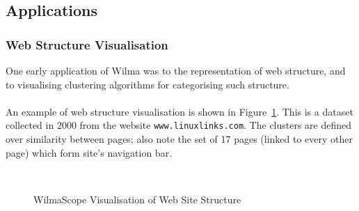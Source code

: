 \documentclass[runningheads]{cl2emult}
\newcommand{\url}[1]{{\small{\tt #1}}}
\begin{document}
\subsection{Applications}

\subsubsection{Web Structure Visualisation}

One early application of Wilma was to the representation of web structure, and
to visualising clustering algorithms for categorising such
structure\cite{eckersley2kclassiscope}.

\paragraph{}

An example of web structure visualisation is shown in Figure~\ref{fig-web}.
This is a dataset collected in 2000 from the website \url{www.linuxlinks.com}.
The clusters are defined over similarity between pages; also note the set of
17 pages (linked to every other page) which form site's navigation bar.

\begin{figure}
\begin{center}
 \\
\caption{{\sc WilmaScope Visualisation of Web Site Structure}}
\label{fig-web}
\end{center}
\end{figure}
\end{document}
